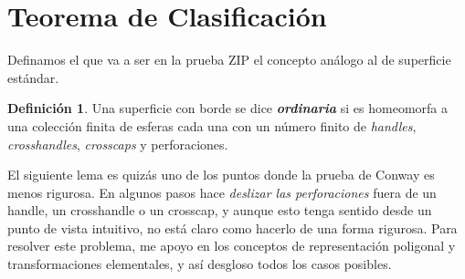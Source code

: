 \documentclass[10pt]{report}
\newcommand{\enfatiza}[1]{\textbf{\textit{#1}}}
\theoremstyle{definition}
\newtheorem{defin}{Definición}[section]
\begin{document}
\section{Teorema de Clasificación}

Definamos el que va a ser en la prueba ZIP el concepto análogo al de superficie estándar.

\begin{defin}%
Una superficie con borde se dice \enfatiza{ordinaria} si es homeomorfa a una colección finita de esferas cada una con un número finito de \textit{handles}, \textit{crosshandles}, \textit{crosscaps} y perforaciones.
\end{defin}

El siguiente lema es quizás uno de los puntos donde la prueba de Conway es menos rigurosa. En algunos pasos hace \textit{deslizar las perforaciones} fuera de un handle, un crosshandle o un crosscap, y aunque esto tenga sentido desde un punto de vista intuitivo, no está claro como hacerlo de una forma rigurosa. Para resolver este problema, me apoyo en los conceptos de representación poligonal y transformaciones elementales, y así desgloso todos los casos posibles.
\end{document}
